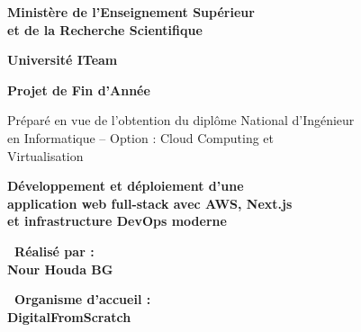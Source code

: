 \documentclass[12pt,a4paper]{report}
\begin{document}
\begin{titlepage}
    
    \vspace*{1cm}
    \centering
    
    {\color{white}\Large\bfseries Ministère de l'Enseignement Supérieur\\
    et de la Recherche Scientifique}
    
    \vspace{0.5cm}
    
    {\color{white}\large\bfseries Université ITeam}
    
    \vspace{3cm}
    
    \begin{tcolorbox}[colback=white, colframe=primaryblue, boxrule=3pt, rounded corners=10pt, width=0.9\textwidth]
        \centering
        {\huge\bfseries\color{primaryblue} Projet de Fin d'Année}
        
        \vspace{0.5cm}
        
        {\large\color{darkblue} Préparé en vue de l'obtention du diplôme National d'Ingénieur\\
        en Informatique – Option : Cloud Computing et\\
        Virtualisation}
    \end{tcolorbox}
    
    \vspace{2cm}
    
    \begin{tcolorbox}[colback=lightgray, colframe=darkblue, boxrule=2pt, rounded corners=8pt, width=0.8\textwidth]
        \centering
        {\LARGE\bfseries\color{darkblue} Développement et déploiement d'une\\
        application web full-stack avec AWS, Next.js\\
        et infrastructure DevOps moderne}
    \end{tcolorbox}
    
    \vspace{2cm}
    
    \begin{minipage}{0.45\textwidth}
        \centering
        {\large\bfseries\color{primaryblue} \faUser\ Réalisé par :}\\
        {\Large\bfseries\color{darkblue} Nour Houda BG}
    \end{minipage}
    \hfill
    \begin{minipage}{0.45\textwidth}
        \centering
        {\large\bfseries\color{primaryblue} \faBuilding\ Organisme d'accueil :}\\
        {\Large\bfseries\color{darkblue} DigitalFromScratch}
    \end{minipage}
    

\end{titlepage}
\end{document}
